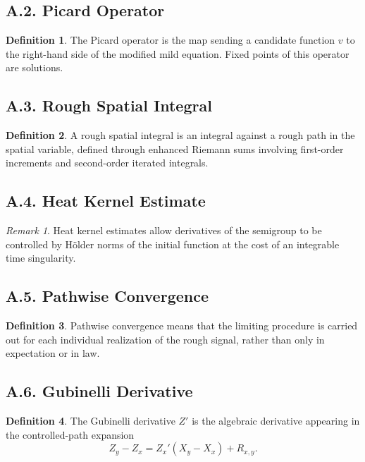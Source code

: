 \documentclass[11pt]{article}
\theoremstyle{definition}
\newtheorem{definition}{Definition}
\theoremstyle{remark}
\newtheorem{remark}{Remark}
\begin{document}
\subsection*{A.2. Picard Operator}
\begin{definition}
The Picard operator is the map sending a candidate function \(v\) to the right-hand side of the modified mild equation. Fixed points of this operator are solutions.
\end{definition}

\subsection*{A.3. Rough Spatial Integral}
\begin{definition}
A rough spatial integral is an integral against a rough path in the spatial variable, defined through enhanced Riemann sums involving first-order increments and second-order iterated integrals.
\end{definition}

\subsection*{A.4. Heat Kernel Estimate}
\begin{remark}
Heat kernel estimates allow derivatives of the semigroup to be controlled by Hölder norms of the initial function at the cost of an integrable time singularity.
\end{remark}

\subsection*{A.5. Pathwise Convergence}
\begin{definition}
Pathwise convergence means that the limiting procedure is carried out for each individual realization of the rough signal, rather than only in expectation or in law.
\end{definition}

\subsection*{A.6. Gubinelli Derivative}
\begin{definition}
The Gubinelli derivative \(Z'\) is the algebraic derivative appearing in the controlled-path expansion
\[
Z_y-Z_x=Z_x'(X_y-X_x)+R_{x,y}.
\]
\end{definition}
\end{document}
